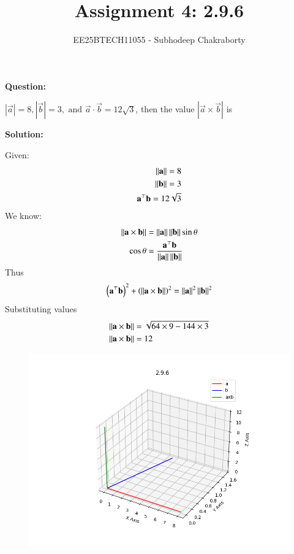 \documentclass[journal,12pt,onecolumn]{IEEEtran}
\theoremstyle{remark}
\begin{document}

\vspace{3cm}

\title{Assignment 4: 2.9.6}
\author{EE25BTECH11055 - Subhodeep Chakraborty}
\maketitle
\hrulefill
\bigskip

\renewcommand{\thefigure}{\theenumi}
\renewcommand{\thetable}{\theenumi}

\textbf{Question:}\par
$|\vec{a}| = 8, |\vec{b}| = 3, \text{ and } \vec{a}\cdot\vec{b} = 12\sqrt{3}$, then the value $|\vec{a}\times\vec{b}|$ is \par
\textbf{Solution:}\par

Given:
\begin{align}
 \left\lVert\mathbf{a}\right\rVert = 8 \\
 \left\lVert\mathbf{b}\right\rVert = 3 \\
 \mathbf{a}^\top\mathbf{b} = 12\sqrt{3}
\end{align}
We know:
\begin{align}
 \left\lVert\mathbf{a}\times\mathbf{b}\right\rVert &= \left\lVert\mathbf{a}\right\rVert\left\lVert\mathbf{b}\right\rVert\sin\theta \\
 \cos\theta &= \frac{\mathbf{a}^\top\mathbf{b}}{\left\lVert\mathbf{a}\right\rVert\left\lVert\mathbf{b}\right\rVert}
\end{align}
Thus
\begin{align}
 \left(\mathbf{a}^\top\mathbf{b}\right)^2 + \left(\left\lVert\mathbf{a}\times\mathbf{b}\right\rVert\right)^2 = \left\lVert\mathbf{a}\right\rVert^2\left\lVert\mathbf{b}\right\rVert^2
\end{align}
Substituting values
\begin{align}
\left\lVert\mathbf{a}\times\mathbf{b}\right\rVert &= \sqrt{64\times9-144\times3} \\
\left\lVert\mathbf{a}\times\mathbf{b}\right\rVert &= 12
\end{align}
\begin{figure}[H]
    \centering
    \includegraphics{figs/plot.png}
    \caption*{}
    \label{fig:plot}
\end{figure}
\end{document}
